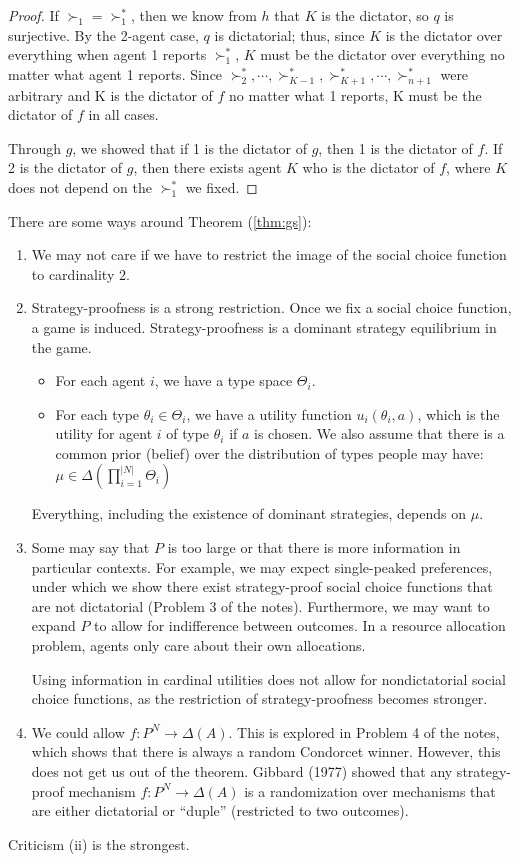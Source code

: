 \begin{proof}
	If $\succ_1= \succ_1^*$, then we know from $h$ that $K$ is the dictator, so $q$ is surjective. By the 2-agent case, $q$ is dictatorial; thus, since $K$ is the dictator over everything when agent 1 reports $\succ_1^*$, $K$ must be the dictator over everything no matter what agent 1 reports. Since $\succ_2^*,\cdots,\succ_{K-1}^*, \succ_{K+1}^*,\cdots, \succ_{n+1}^*$ were arbitrary and K is the dictator of $f$ no matter what 1 reports, K must be the dictator of $f$ in all cases.

	Through $g$, we showed that if 1 is the dictator of $g$, then 1 is the dictator of $f$. If 2 is the dictator of $g$, then there exists agent $K$ who is the dictator of $f$, where $K$ does not depend on the $\succ_1^*$ we fixed.
\end{proof}

\begin{remark}
	There are some ways around Theorem (\ref{thm:gs}):
	\begin{enumerate}[label = (\roman*)]
		\item We may not care if we have to restrict the image of the social choice function to cardinality $2$.
		\item Strategy-proofness is a strong restriction. Once we fix a social choice function, a game is induced. Strategy-proofness is a dominant strategy equilibrium in the game.
			\begin{itemize}
				\item For each agent $i$, we have a type space $\Theta_i$. 
				\item For each type $\theta_i \in \Theta_i$, we have a utility function $u_i(\theta_i, a)$, which is the utility for agent $i$ of type $\theta_i$ if $a$ is chosen. We also assume that there is a common prior (belief) over the distribution of types people may have: $\mu \in \Delta \left( \prod_{i=1}^{\left| N \right|} \Theta_i  \right)$
			\end{itemize}
			Everything, including the existence of dominant strategies, depends on $\mu$.
		\item Some may say that $P$ is too large or that there is more information in particular contexts. For example, we may expect single-peaked preferences, under which we show there exist strategy-proof social choice functions that are not dictatorial (Problem 3 of the notes). Furthermore, we may want to expand $P$ to allow for indifference between outcomes. In a resource allocation problem, agents only care about their own allocations.

			Using information in cardinal utilities does not allow for nondictatorial social choice functions, as the restriction of strategy-proofness becomes stronger.
		\item We could allow $f: P^N \to \Delta(A)$. This is explored in Problem 4 of the notes, which shows that there is always a random Condorcet winner. However, this does not get us out of the theorem. Gibbard (1977) showed that any strategy-proof mechanism $f: P^N \to \Delta(A)$ is a randomization over mechanisms that are either dictatorial or ``duple'' (restricted to two outcomes).
	\end{enumerate}

	Criticism (ii) is the strongest.
\end{remark}
